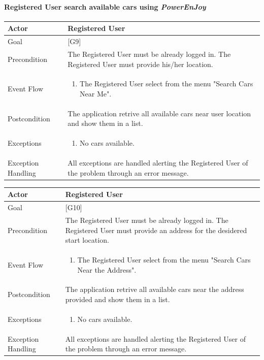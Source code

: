 \documentclass{article}
\newcommand{\pej}{\mbox{\normalfont\itshape PowerEnJoy }}
\begin{document}
		\paragraph{Registered User search available cars using \pej}
		\begin{center}
			\begin{tabular}{| l | p{9cm} |}\hline
				Actor & Registered User\\\hline
				Goal & {[}G9{]} \\\hline
				Precondition & The Registered User must be already logged in. The Registered User must provide his/her location.\\\hline
				Event Flow & \begin{enumerate}
					\item The Registered User select from the menu "Search Cars Near Me".
				\end{enumerate}\\\hline
				Postcondition & The application retrive all available cars near user location and show them in a list.\\\hline
				Exceptions & \begin{enumerate}
					\item No cars available.
				\end{enumerate}\\\hline
				Exception Handling&All exceptions are handled alerting the Registered User of the
				problem through an error message.\\\hline
			\end{tabular}
		\end{center}
		\begin{center}
			\begin{tabular}{| l | p{9cm} |}\hline
				Actor & Registered User\\\hline
				Goal & {[}G10{]} \\\hline
				Precondition & The Registered User must be already logged in. The Registered User must provide an address for the desidered start location.\\\hline
				Event Flow & \begin{enumerate}
					\item The Registered User select from the menu "Search Cars Near the Address".
				\end{enumerate}\\\hline
				Postcondition & The application retrive all available cars near the address provided and show them in a list.\\\hline
				Exceptions & \begin{enumerate}
					\item No cars available.
				\end{enumerate}\\\hline
				Exception Handling&All exceptions are handled alerting the Registered User of the
				problem through an error message.\\\hline
			\end{tabular}
		\end{center}
\end{document}
